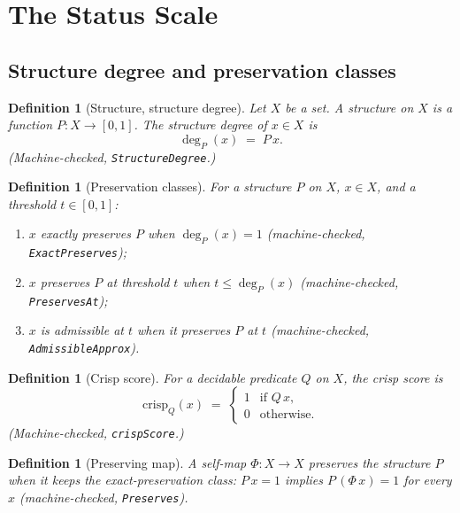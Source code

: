 \documentclass[11pt,a4paper]{article}
\newtheorem{definition}[theorem]{Definition}
\begin{document}
\section{The Status Scale}
\label{sec:scale}

\subsection{Structure degree and preservation classes}

\begin{definition}[Structure, structure degree]
\label{def:structure}
Let $X$ be a set.
A \emph{structure} on $X$ is a function $P : X \to [0,1]$.
The \emph{structure degree} of $x \in X$ is
\[
  \deg_P(x) \;=\; P\,x .
\]
(Machine-checked, \texttt{StructureDegree}.)
\end{definition}

\begin{definition}[Preservation classes]
\label{def:classes}
For a structure $P$ on $X$, $x \in X$, and a threshold $t \in [0,1]$:
\begin{enumerate}[label=(\alph*),nosep]
\item $x$ \emph{exactly preserves} $P$ when $\deg_P(x) = 1$
  (machine-checked, \texttt{ExactPreserves});
\item $x$ \emph{preserves $P$ at threshold $t$} when
  $t \le \deg_P(x)$
  (machine-checked, \texttt{PreservesAt});
\item $x$ is \emph{admissible at $t$} when it preserves $P$ at $t$
  (machine-checked, \texttt{AdmissibleApprox}).
\end{enumerate}
\end{definition}

\begin{definition}[Crisp score]
\label{def:crisp}
For a decidable predicate $Q$ on $X$, the \emph{crisp score} is
\[
  \mathrm{crisp}_Q(x) \;=\;
  \begin{cases}
    1 & \text{if } Q\,x, \\
    0 & \text{otherwise.}
  \end{cases}
\]
(Machine-checked, \texttt{crispScore}.)
\end{definition}

\begin{definition}[Preserving map]
\label{def:preserves}
A self-map $\Phi : X \to X$ \emph{preserves} the structure $P$ when it
keeps the exact-preservation class:
$P\,x = 1$ implies $P\,(\Phi\,x) = 1$ for every $x$
(machine-checked, \texttt{Preserves}).
\end{definition}
\end{document}
